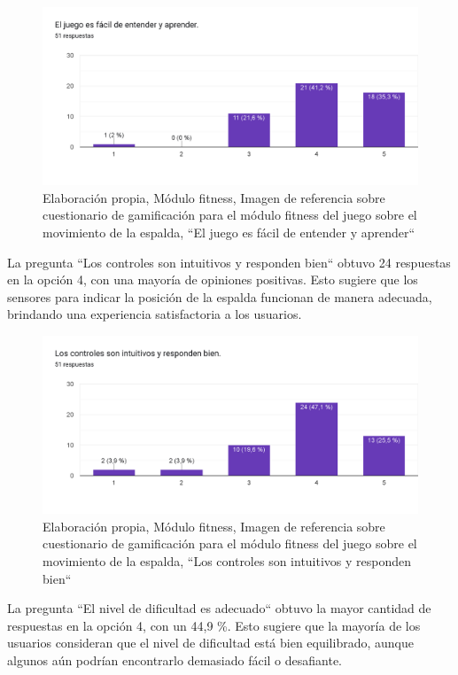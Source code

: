 \begin{figure}[H]
  \centering
  \includegraphics[width=0.7\linewidth]{Imagenes/fd1.png}
  \caption{Elaboración propia, Módulo fitness, Imagen de referencia sobre cuestionario de gamificación para el módulo fitness del juego sobre el movimiento de la espalda, ``El juego es fácil de entender y aprender``}
  \label{fig:cuestionario12fitness}
\end{figure}


La pregunta ``Los controles son intuitivos y responden bien`` obtuvo 24 respuestas en la opción 4, con una mayoría de opiniones positivas. Esto sugiere que los sensores para indicar la posición de la espalda funcionan de manera adecuada, brindando una experiencia satisfactoria a los usuarios.

\begin{figure}[H]
  \centering
  \includegraphics[width=0.7\linewidth]{Imagenes/fd2.png}
  \caption{Elaboración propia, Módulo fitness, Imagen de referencia sobre cuestionario de gamificación para el módulo fitness del juego sobre el movimiento de la espalda, ``Los controles son intuitivos y responden bien``}
  \label{fig:cuestionario13fitness}
\end{figure}

La pregunta ``El nivel de dificultad es adecuado`` obtuvo la mayor cantidad de respuestas en la opción 4, con un 44,9 \%. Esto sugiere que la mayoría de los usuarios consideran que el nivel de dificultad está bien equilibrado, aunque algunos aún podrían encontrarlo demasiado fácil o desafiante.

